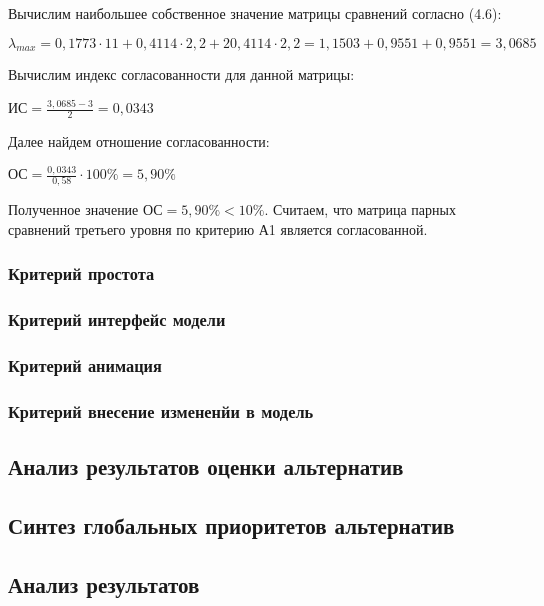 Вычислим наибольшее собственное значение матрицы сравнений согласно (4.6):

$\lambda_{max} = 0,1773 \cdot 11 + 0,4114 \cdot  2,2 + 20,4114 \cdot 2,2 = 1,1503 + 0,9551 + 0,9551 = 3,0685$

Вычислим индекс согласованности для данной матрицы:

$\text{ИС} = \frac{3,0685 - 3}{2} = 0,0343$

Далее найдем отношение согласованности:

$\text{ОС} = \frac{0,0343}{0,58} \cdot 100\% = 5,90\%$

Полученное значение $\text{ОС} = 5,90\% < 10\%$.
Считаем, что матрица парных сравнений третьего уровня по критерию А1 является согласованной.

\subsubsection{Критерий простота}

\subsubsection{Критерий интерфейс модели}

\subsubsection{Критерий анимация}

\subsubsection{Критерий внесение измененйи в модель}

\subsection{Анализ результатов оценки альтернатив}

\subsection{Синтез глобальных приоритетов альтернатив}

\subsection{Анализ результатов}

\clearpage
